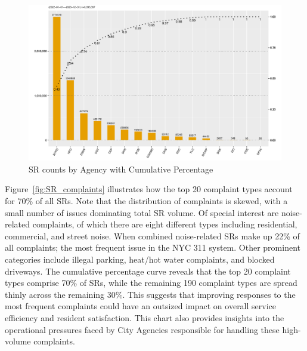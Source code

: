 \documentclass[linenumber]{jdsart}
\begin{document}
\begin{figure}[tbp]
	\centering
	\includegraphics[width = \textwidth]{SRs_by_Agency.pdf}
  	\caption{SR counts by Agency with Cumulative Percentage}
	\label{fig:SRcountbyAgency}
\end{figure}

Figure~\ref{fig:SR_complaints}
illustrates how the top 20 complaint types account for 70\% 
of all SRs. Note that the distribution of complaints is skewed, 
with a small number of issues dominating total SR volume. 
Of special interest are noise\mbox{-}related complaints, of which there are eight different
types including residential, commercial, and 
street noise. When combined noise\mbox{-}related SRs make up 22\% of all 
complaints; the most frequent issue in the NYC 311 system. 
Other prominent categories include illegal parking, heat/hot water 
complaints, and blocked driveways. The cumulative percentage curve 
reveals that the top 20 complaint types comprise 70\% of SRs,
while the remaining 190 complaint types are spread thinly 
across the remaining 30\%. This suggests that improving 
responses to the most frequent complaints could have an 
outsized impact on overall service efficiency and resident 
satisfaction. This chart also provides insights into the 
operational pressures faced by City Agencies 
responsible for handling these high-volume complaints.
\end{document}
